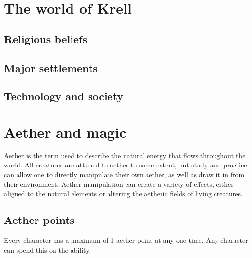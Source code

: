 \documentclass[a4paper,11pt,oneside]{book}
\newcommand{\textlf}[1]{\textbf{\titlecap{#1}}}
\begin{document}
%



\chapter{The world of Krell}

\section{Religious beliefs}

\section{Major settlements}

\section{Technology and society}





\chapter{Aether and magic}
Aether is the term used to describe the natural energy that flows throughout the world. All creatures are attuned to aether to some extent, but study and practice can allow one to directly manipulate their own aether, as well as draw it in from their environment. Aether manipulation can create a variety of effects, either aligned to the natural elements or altering the aetheric fields of living creatures.

\section{Aether points}
Every character has a maximum of 1 aether point at any one time. Any character can spend this on the \textlf{aether surge} ability.
\end{document}
